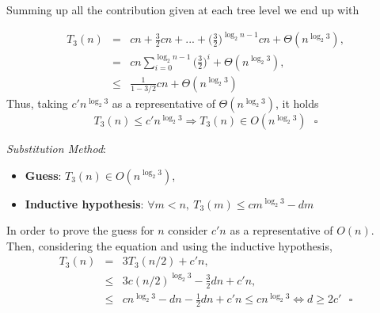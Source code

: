 \documentclass{article}
\begin{document}
\begin{figure}[h]
\begin{center}
			\label{recursion_tree_3}
		\end{center}
		
	\end{figure}
	\noindent Summing up all the contribution given at each tree level we end up with
	
	\begin{eqnarray}
	\nonumber
	T_3(n) &=& cn + \frac{3}{2} cn + ... + \Bigg( \frac{3}{2} \Bigg)^{\log_2 n-1} cn + \Theta(n^{\log_2 3}),\\
	\nonumber
	&=& cn \sum_{i=0}^{\log_2 n - 1} \Bigg( \frac{3}{2} \Bigg)^i + \Theta(n^{\log_2 3}), \\
	\nonumber
	&\leq& \frac{1}{1-3/2}cn + \Theta(n^{\log_2 3}) 
	\end{eqnarray}
	\noindent Thus, taking $c'n^{\log_2 3}$ as a representative of $\Theta(n^{\log_2 3})  $, it holds
	$$ T_3(n) \leq c'n^{\log_2 3} \Rightarrow T_3(n) \in O(n^{\log_2 3}) ~~~ \square$$


	\noindent \textit{Substitution Method}:
	\begin{itemize}
		\item \textbf{Guess}: $T_3(n) \in O(n^{\log_2 3})$,
		\item \textbf{Inductive hypothesis}: $\forall m < n, ~  T_3(m) \leq cm^{\log_2 3} - dm$
	\end{itemize}   
	In order to prove the guess for $n$ consider $c'n$ as a representative of $O(n)$. Then, considering the equation and using the inductive hypothesis,
	\begin{eqnarray}
	\nonumber
	T_3(n) &=& 3 T_3 (n/2) + c'n,\\
	\nonumber
	&\leq& 3 c (n/2)^{\log_2 3} - \frac{3}{2}dn + c'n,\\
	\nonumber
	&\leq& cn^{\log_2 3} - dn - \frac{1}{2} dn + c'n \leq  cn^{\log_2 3}  \Leftrightarrow d \geq 2 c' ~~~ \square
	\nonumber 
	\end{eqnarray} 
	
\end{document}
